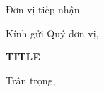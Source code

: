 \documentclass{letter}
\date{{{DATE}}}
\begin{document}
\begin{letter}{Đơn vị tiếp nhận}
\opening{Kính gửi Quý đơn vị,}
\textbf{{{TITLE}}}

\closing{Trân trọng,}
\end{letter}
\end{document}
